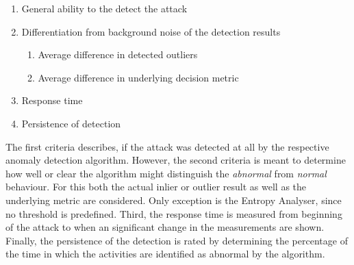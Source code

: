 \begin{enumerate}
	\item General ability to the detect the attack
	\item Differentiation from background noise of the detection results
		\begin{enumerate}
			\item Average difference in detected outliers
			\item Average difference in underlying decision metric
		\end{enumerate}
	\item Response time 
	\item Persistence of detection
\end{enumerate}

The first criteria describes, if the attack was detected at all by the respective anomaly detection algorithm.
However, the second criteria is meant to determine how well or clear the algorithm might distinguish the \emph{abnormal} from \emph{normal} behaviour. For this both the actual inlier or outlier result as well as the underlying metric are considered. Only exception is the Entropy Analyser, since no threshold is predefined.
Third, the response time is measured from beginning of the attack to when an significant change in the measurements are shown.
Finally, the persistence of the detection is rated by determining the percentage of the time in which the activities are identified as abnormal by the algorithm.

\begin{comment}
Angriffe:

DoS
	Kurzschluss im Bus -> DoS auf gesamtem Segment
	A_Restart-Pakete -> DoS gegen einzelne Teilnehmer
Replay-Angriffe
	Zeit mitschneiden -> wiedergeben
	Tag mitschneiden, komprimiert wiedergeben
Manipulation von Paketen (Payload tauschen)
Konfiguration manipulieren
Überwindung von Linienkopplern
Address-Spoofing
	falsche Adresse in Liniensegment
	mit existierender Adresse senden
Netzanalyse mit knxMap (https://github.com/takeshixx/knxmap)
Mitlesen und sofort gegenteilige Aktion auslösen
High-Level-Angriffe:
	nur best. Aktionen zulassen
	Provokation/Sabotage von menschl. Verhalten
Social-Engineering -> Einschleusen von Geräten
\end{comment}